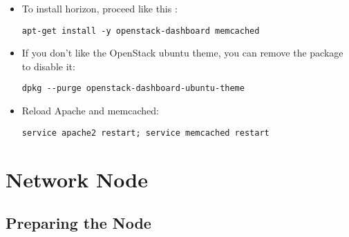 \begin{itemize}
\item To install horizon, proceed like this :

\begin{verbatim}
apt-get install -y openstack-dashboard memcached
\end{verbatim}


\item If you don't like the OpenStack ubuntu theme, you can remove the package to disable it:

\begin{verbatim}
dpkg --purge openstack-dashboard-ubuntu-theme 
\end{verbatim}


\item Reload Apache and memcached:

\begin{verbatim}
service apache2 restart; service memcached restart
\end{verbatim}


\end{itemize}

\chapter{Network Node}
\label{networknode}

\section{Preparing the Node}
\label{preparingthenode}

